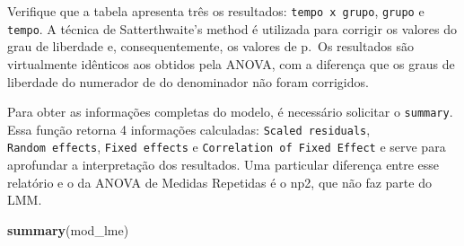 \documentclass[
]{book}
\newenvironment{Shaded}{\begin{snugshade}}{\end{snugshade}}
\newcommand{\KeywordTok}[1]{\textcolor[rgb]{0.13,0.29,0.53}{\textbf{#1}}}
\newcommand{\NormalTok}[1]{#1}
\begin{document}
Verifique que a tabela apresenta três os resultados: \texttt{tempo\ x\ grupo}, \texttt{grupo} e \texttt{tempo}. A técnica de Satterthwaite's method é utilizada para corrigir os valores do grau de liberdade e, consequentemente, os valores de p.~Os resultados são virtualmente idênticos aos obtidos pela ANOVA, com a diferença que os graus de liberdade do numerador de do denominador não foram corrigidos.

Para obter as informações completas do modelo, é necessário solicitar o \texttt{summary}. Essa função retorna 4 informações calculadas: \texttt{Scaled\ residuals}, \texttt{Random\ effects}, \texttt{Fixed\ effects} e \texttt{Correlation\ of\ Fixed\ Effect} e serve para aprofundar a interpretação dos resultados. Uma particular diferença entre esse relatório e o da ANOVA de Medidas Repetidas é o np2, que não faz parte do LMM.

\begin{Shaded}
\begin{Highlighting}[]
\KeywordTok{summary}\NormalTok{(mod_lme) }
\end{Highlighting}
\end{Shaded}
\end{document}
